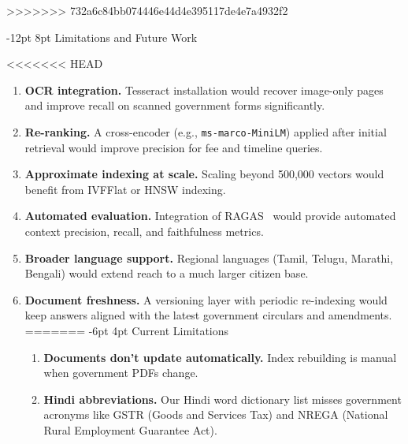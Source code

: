 \documentclass[10pt,twocolumn]{article}
\makeatletter
\renewcommand{\section}{\@startsection{section}{1}{\z@}%
  {-12pt \@plus -2pt \@minus -1pt}%
  {8pt \@plus 0.3pt}%
  {\normalfont\Large\bfseries}}
\renewcommand{\subsection}{\@startsection{subsection}{2}{\z@}%
  {-6pt \@plus -1pt \@minus -0.5pt}%
  {4pt \@plus 0.2pt}%
  {\normalfont\large\bfseries}}
\newcommand{\tightlist}{\setlength{\itemsep}{1pt}\setlength{\topsep}{2pt}\setlength{\parsep}{0pt}}
\makeatother
\begin{document}
>>>>>>> 732a6c84bb074446e44d4e395117de4e7a4932f2

\section{Limitations and Future Work}

<<<<<<< HEAD
\begin{enumerate}
  \tightlist
  \item \textbf{OCR integration.}  Tesseract installation would recover image-only pages
    and improve recall on scanned government forms significantly.
  \item \textbf{Re-ranking.}  A cross-encoder (e.g., \texttt{ms-marco-MiniLM}) applied
    after initial retrieval would improve precision for fee and timeline queries.
  \item \textbf{Approximate indexing at scale.}  Scaling beyond 500,000 vectors would
    benefit from IVFFlat or HNSW indexing.
  \item \textbf{Automated evaluation.}  Integration of RAGAS~\cite{es2023ragas} would
    provide automated context precision, recall, and faithfulness metrics.
  \item \textbf{Broader language support.}  Regional languages (Tamil, Telugu, Marathi,
    Bengali) would extend reach to a much larger citizen base.
  \item \textbf{Document freshness.}  A versioning layer with periodic re-indexing would
    keep answers aligned with the latest government circulars and amendments.
=======
\subsection{Current Limitations}

\begin{enumerate}
  \tightlist
  \item \textbf{Documents don't update automatically.}  Index rebuilding is manual when government PDFs change.

  \item \textbf{Hindi abbreviations.}  Our Hindi word dictionary list misses government acronyms like GSTR (Goods and Services Tax) and NREGA (National Rural Employment Guarantee Act).


\end{enumerate}
\end{enumerate}
\end{document}
